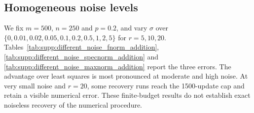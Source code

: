 \documentclass[numsec,webpdf,modern,large,namedate]{oup-authoring-template}
\theoremstyle{plain}
\theoremstyle{remark}
\newif\ifmarkchanges
\newenvironment{revision}{\begingroup\ifmarkchanges\color{red}\fi}{\endgroup}
\begin{document}
\begin{revision}
\subsection{Homogeneous noise levels}
We fix $m=500$, $n=250$ and $p=0.2$, and vary $\sigma$ over $\{0,0.01,0.02,0.05,0.1,0.2,0.5,1,2,5\}$ for $r=5,10,20$. Tables~\ref{tab:supp:different_noise_fnorm_addition}, \ref{tab:supp:different_noise_specnorm_addition} and \ref{tab:supp:different_noise_maxnorm_addition} report the three errors. The advantage over least squares is most pronounced at moderate and high noise. At very small noise and $r=20$, some recovery runs reach the 1500-update cap and retain a visible numerical error. These finite-budget results do not establish exact noiseless recovery of the numerical procedure.

\end{revision}
\end{document}
